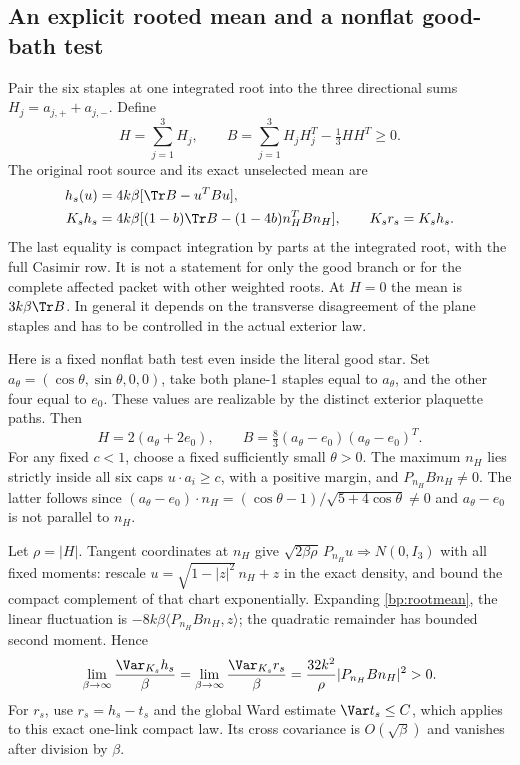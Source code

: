 \subsection{An explicit rooted mean and a nonflat good-bath test}

Pair the six staples at one integrated root into the three directional sums $H_j=a_{j,+}+a_{j,-}$. Define
\begin{equation}
 H=\sum_{j=1}^3H_j,\qquad
 B=\sum_{j=1}^3H_jH_j^T-\tfrac13HH^T\ge0.
 \label{bp:Bmatrix}
\end{equation}
The original root source and its exact unselected mean are
\begin{align}
 h_s(u)&=4k\beta[\Tr B-u^TBu],\notag\\
 K_sh_s&=4k\beta[(1-b)\Tr B-(1-4b)n_H^TBn_H],
 \qquad K_sr_s=K_sh_s.
 \label{bp:rootmean}
\end{align}
The last equality is compact integration by parts at the integrated root, with the full Casimir row. It is not a statement for only the good branch or for the complete affected packet with other weighted roots. At $H=0$ the mean is $3k\beta\Tr B$. In general it depends on the transverse disagreement of the plane staples and has to be controlled in the actual exterior law.

Here is a fixed nonflat bath test even inside the literal good star. Set
$a_\theta=(\cos\theta,\sin\theta,0,0)$, take both plane-1 staples equal to $a_\theta$, and the other four equal to $e_0$. These values are realizable by the distinct exterior plaquette paths. Then
\[
 H=2(a_\theta+2e_0),\qquad
 B=\tfrac83(a_\theta-e_0)(a_\theta-e_0)^T.
\]
For any fixed $c<1$, choose a fixed sufficiently small $\theta>0$. The maximum $n_H$ lies strictly inside all six caps $u\cdot a_i\ge c$, with a positive margin, and $P_{n_H}Bn_H\ne0$. The latter follows since
$(a_\theta-e_0)\cdot n_H=(\cos\theta-1)/\sqrt{5+4\cos\theta}\ne0$ and $a_\theta-e_0$ is not parallel to $n_H$.

Let $\rho=|H|$. Tangent coordinates at $n_H$ give
$\sqrt{2\beta\rho}\,P_{n_H}u\Longrightarrow N(0,I_3)$ with all fixed moments: rescale $u=\sqrt{1-|z|^2}\,n_H+z$ in the exact density, and bound the compact complement of that chart exponentially. Expanding \eqref{bp:rootmean}, the linear fluctuation is $-8k\beta\langle P_{n_H}Bn_H,z\rangle$; the quadratic remainder has bounded second moment. Hence
\begin{equation}
 \lim_{\beta\to\infty}\frac{\Var_{K_s}h_s}{\beta}
 =\lim_{\beta\to\infty}\frac{\Var_{K_s}r_s}{\beta}
 =\frac{32k^2}{\rho}|P_{n_H}Bn_H|^2>0.
 \label{bp:goodbathcounterexample}
\end{equation}
For $r_s$, use $r_s=h_s-t_s$ and the global Ward estimate $\Var t_s\le C$, which applies to this exact one-link compact law. Its cross covariance is $O(\sqrt\beta)$ and vanishes after division by $\beta$.

